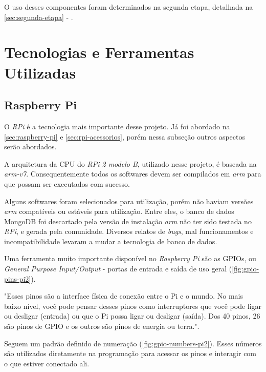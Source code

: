 O uso desses componentes foram determinados na segunda etapa, detalhada na \autoref{sec:segunda-etapa} - .


\section{Tecnologias e Ferramentas Utilizadas}\label{sec:tecnologias-ferramentas}


\subsection{Raspberry Pi}\label{sec:rpi-tecnologia}

O \textit{RPi} é a tecnologia mais importante desse projeto. Já foi abordado na \autoref{sec:raspberry-pi} e \autoref{sec:rpi-acessorios}, porém nessa subseção outros aspectos serão abordados.

A arquitetura da CPU do \textit{RPi 2 modelo B}, utilizado nesse projeto, é baseada na \textit{arm-v7}. Consequentemente todos os softwares devem ser compilados em \textit{arm} para que possam ser executados com sucesso. 

Alguns softwares foram selecionados para utilização, porém não haviam versões \textit{arm} compatíveis ou estáveis para utilização. Entre eles, o banco de dados MongoDB foi descartado pela versão de instalação \textit{arm} não ter sido testada no \textit{RPi}, e gerada pela comunidade. Diversos relatos de \textit{bugs}, mal funcionamentos e incompatibilidade levaram a mudar a tecnologia de banco de dados.

Uma ferramenta muito importante disponível no \textit{Raspberry Pi} são as GPIOs, ou \textit{General Purpose Input/Output} - portas de entrada e saída de uso geral (\autoref{fig:gpio-pins-pi2}).  

\begin{citacao}
"Esses pinos são a interface física de conexão entre o Pi e o mundo. No mais baixo nível, você pode pensar desses pinos como interruptores que você pode ligar ou desligar (entrada) ou que o Pi possa ligar ou desligar (saída). Dos 40 pinos, 26 são pinos de GPIO e os outros são pinos de energia ou terra.". \cite{rpi-gpio}
\end{citacao}

Seguem um padrão definido de numeração (\autoref{fig:gpio-numbers-pi2}). Esses números são utilizados diretamente na programação para acessar os pinos e interagir com o que estiver conectado ali.

